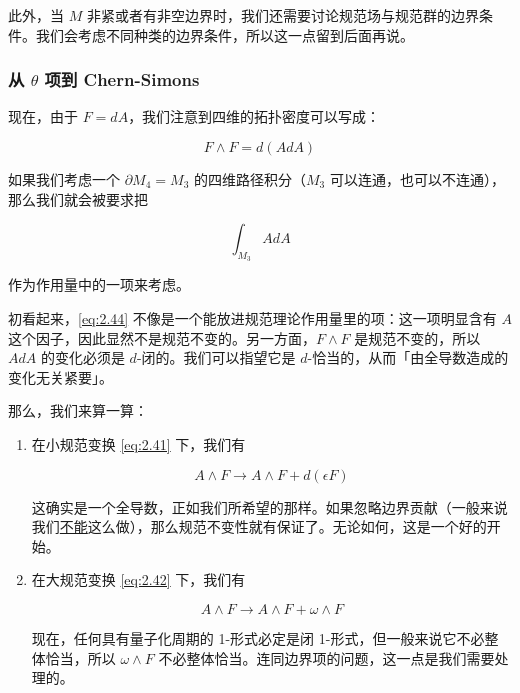 此外，当 $M$ 非紧或者有非空边界时，我们还需要讨论规范场与规范群的边界条件。我们会考虑不同种类的边界条件，所以这一点留到后面再说。

\subsubsection{从 $\theta$ 项到 Chern-Simons} %

现在，由于 $F=dA$，我们注意到四维的拓扑密度可以写成：

\begin{equation}
  F\wedge F=d(AdA)
  \tag{2.43}
  \label{eq:2.43}
\end{equation}

如果我们考虑一个 $\partial M_4=M_3$ 的四维路径积分（$M_3$ 可以连通，也可以不连通），那么我们就会被要求把

\begin{equation}
  \int_{M_3}AdA
  \tag{2.44}
  \label{eq:2.44}
\end{equation}

作为作用量中的一项来考虑。

初看起来，\eqref{eq:2.44} 不像是一个能放进规范理论作用量里的项：这一项明显含有 $A$ 这个因子，因此显然不是规范不变的。另一方面，$F\wedge F$ 是规范不变的，所以 $AdA$ 的变化必须是 $d$-闭的。我们可以指望它是 $d$-恰当的，从而「由全导数造成的变化无关紧要」。

那么，我们来算一算：

\begin{enumerate}
  \item 在小规范变换 \eqref{eq:2.41} 下，我们有

\begin{equation}
  A\wedge F\to A\wedge F+d(\epsilon F)
  \tag{2.45}
  \label{eq:2.45}
\end{equation}

  这确实是一个全导数，正如我们所希望的那样。如果忽略边界贡献（一般来说我们\underline{不能}这么做），那么规范不变性就有保证了。无论如何，这是一个好的开始。

  \item 在大规范变换 \eqref{eq:2.42} 下，我们有

\begin{equation}
  A\wedge F\to A\wedge F+\omega\wedge F
  \tag{2.46}
  \label{eq:2.46}
\end{equation}

  现在，任何具有量子化周期的 1-形式必定是闭 1-形式，但一般来说它不必整体恰当，所以 $\omega\wedge F$ 不必整体恰当。连同边界项的问题，这一点是我们需要处理的。
\end{enumerate}

